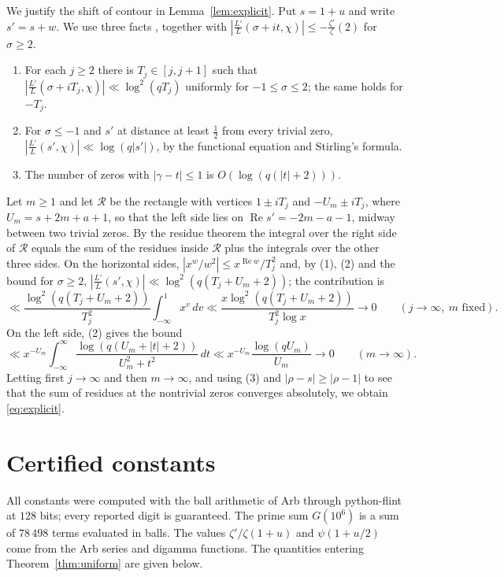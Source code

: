 \documentclass[11pt]{amsart}
\theoremstyle{definition}
\theoremstyle{remark}
\renewcommand{\Re}{\operatorname{Re}}
\begin{document}
We justify the shift of contour in Lemma~\ref{lem:explicit}. Put $s=1+u$ and write $s'=s+w$. We use three facts \cite[Chapters 9, 12, 16, 17 and 19]{Dav80}, together with $|\frac{L'}{L}(\sigma+it,\chi)|\le-\frac{\zeta'}{\zeta}(2)$ for $\sigma\ge2$.
\begin{enumerate}
\item For each $j\ge2$ there is $T_j\in[j,j+1]$ such that $|\frac{L'}{L}(\sigma+iT_j,\chi)|\ll\log^2(qT_j)$ uniformly for $-1\le\sigma\le2$; the same holds for $-T_j$.
\item For $\sigma\le-1$ and $s'$ at distance at least $\tfrac12$ from every trivial zero, $|\frac{L'}{L}(s',\chi)|\ll\log(q|s'|)$, by the functional equation and Stirling's formula.
\item The number of zeros with $|\gamma-t|\le1$ is $O(\log(q(|t|+2)))$.
\end{enumerate}
Let $m\ge1$ and let $\mathcal R$ be the rectangle with vertices $1\pm iT_j$ and $-U_m\pm iT_j$, where $U_m=s+2m+a+1$, so that the left side lies on $\Re s'=-2m-a-1$, midway between two trivial zeros. By the residue theorem the integral over the right side of $\mathcal R$ equals the sum of the residues inside $\mathcal R$ plus the integrals over the other three sides. On the horizontal sides, $|x^w/w^2|\le x^{\Re w}/T_j^2$ and, by (1), (2) and the bound for $\sigma\ge2$, $|\frac{L'}{L}(s',\chi)|\ll\log^2(q(T_j+U_m+2))$; the contribution is
\[
\ll\frac{\log^2(q(T_j+U_m+2))}{T_j^2}\int_{-\infty}^1x^{v}\,dv\ll\frac{x\log^2(q(T_j+U_m+2))}{T_j^2\log x}\longrightarrow0\qquad(j\to\infty,\ m\text{ fixed}).
\]
On the left side, (2) gives the bound
\[
\ll x^{-U_m}\int_{-\infty}^\infty\frac{\log(q(U_m+|t|+2))}{U_m^2+t^2}\,dt\ll x^{-U_m}\frac{\log(qU_m)}{U_m}\longrightarrow0\qquad(m\to\infty).
\]
Letting first $j\to\infty$ and then $m\to\infty$, and using (3) and $|\rho-s|\ge|\rho-1|$ to see that the sum of residues at the nontrivial zeros converges absolutely, we obtain \eqref{eq:explicit}.

\section{Certified constants}\label{app:numerics}

All constants were computed with the ball arithmetic of Arb \cite{Joh17} through python-flint at $128$ bits; every reported digit is guaranteed. The prime sum $G(10^6)$ is a sum of $78\,498$ terms evaluated in balls. The values $\zeta'/\zeta(1+u)$ and $\psi(1+u/2)$ come from the Arb series and digamma functions. The quantities entering Theorem~\ref{thm:uniform} are given below.
\end{document}
